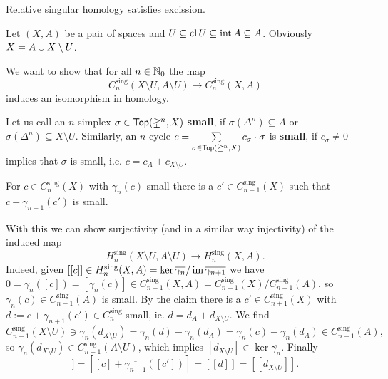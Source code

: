 	\begin{theorem}
		Relative singular homology satisfies excission.
	\end{theorem}
	\begin{sketch}
		Let $(X,A)$ be a pair of spaces and $U \subseteq \operatorname{cl} U \subseteq \operatorname{int} A \subseteq A$. Obviously $X = A \cup X \setminus U$.

		We want to show that for all $n \in \mathbb{N}_0$ the map
		\begin{equation*}
			C_n^\text{sing}(X\setminus U, A \setminus U) \longrightarrow C_n^\text{sing}(X,A)
		\end{equation*}
		induces an isomorphism in homology.

		Let us call an $n$-simplex $\sigma \in \textsf{Top}(\mathbb{\Delta}^n,X)$ \textbf{small}, if $\sigma(\mathbb{\Delta}^n) \subseteq A$ or $\sigma(\mathbb{\Delta}^n) \subseteq X \setminus U$. Similarly, an $n$-cycle $c = \sum \limits_{\sigma \in \textsf{Top}(\mathbb{\Delta}^n,X)} c_\sigma \cdot \sigma$ is \textbf{small}, if $c_\sigma \neq 0$ implies that $\sigma$ is small, i.e. $c = c_A + c_{X \setminus U}$.

		\begin{claim}
			For $c \in C_n^\text{sing}(X)$ with $\gamma_n(c)$ small there is a $c' \in C_{n+1}^\text{sing}(X)$ such that $c+\gamma_{n+1}(c')$ is small.
		\end{claim}

		With this we can show surjectivity (and in a similar way injectivity) of the induced map
		\begin{equation*}
			H_n^\text{sing}(X\setminus U,A\setminus U) \longrightarrow H_n^\text{sing}(X,A).
		\end{equation*}
		Indeed, given $[[c]] \in H_n^\text{sing}(X,A) = \ker \overline{\gamma_n}/\operatorname{im} \overline{\gamma_{n+1}}$ we have $0=\overline{\gamma_n}([c]) = [\gamma_n(c)] \in C_{n-1}^\text{sing}(X,A) = C_{n-1}^\text{sing}(X)/C_{n-1}^\text{sing}(A)$, so $\gamma_n(c) \in C_{n-1}^\text{sing}(A)$ is small. By the claim there is a $c' \in C_{n+1}^\text{sing}(X)$ with $d := c + \gamma_{n+1}(c') \in C_n^\text{sing}$ small, ie. $d = d_A + d_{X \setminus U}$. We find
		\begin{equation*}
			C_{n-1}^\text{sing}(X\setminus U) \ni \gamma_n(d_{X \setminus U}) = \gamma_n(d)-\gamma_n(d_A) = \gamma_n(c)-\gamma_n(d_A) \in C_{n-1}^\text{sing}(A),
		\end{equation*}
		so $\gamma_n(d_{X \setminus U}) \in C_{n-1}^\text{sing}(A \setminus U)$, which implies $[d_{X\setminus U}] \in \ker \overline{\gamma_n}$. Finally
		\begin{equation*}
			[[c]] = [[c]+\overline{\gamma_{n+1}}([c'])] = [[d]] = [[d_{X \setminus U}]].
		\end{equation*}


\end{sketch}
